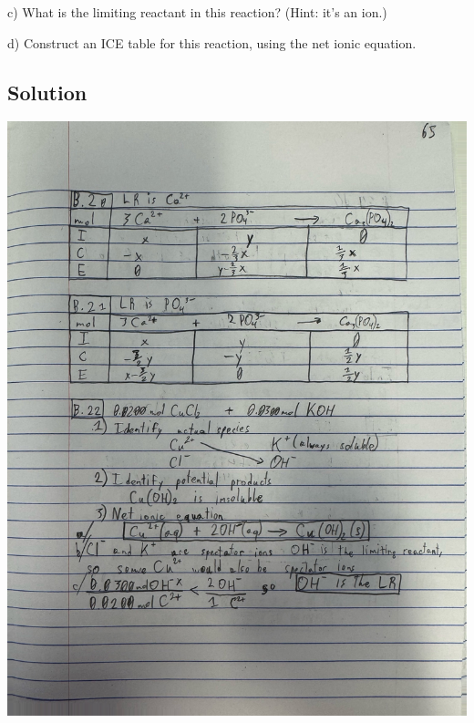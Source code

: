 \documentclass[10pt]{article}
\begin{document}
        c) What is the limiting reactant in this reaction? (Hint: it's an ion.)
        
        d) Construct an ICE table for this reaction, using the net ionic equation.

        \subsection{Solution}
            \begin{center}
                \includegraphics[width=\textwidth, trim={5in 9in 1in 25in},clip]{"Answers Images/IMG_6651.jpg"}


\end{center}
\end{document}
